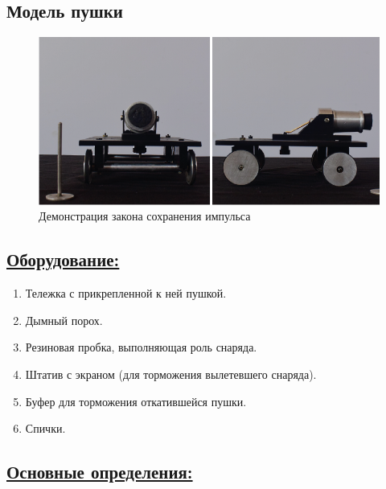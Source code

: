 \documentclass[14pt,a4paper,oneside]{extarticle}	%
\begin{document}

\begin{center}
	\subsection*{Модель пушки}
\end{center}

\begin{figure}[H] 
	\centering 	
	\includegraphics[width=1\linewidth]{cannon-1.png}
	\caption{Демонстрация  закона сохранения импульса}
	\label{cannon-1}
\end{figure}


\subsection*{\underline{Оборудование:}}

\begin{enumerate}
	\item Тележка с прикрепленной к ней пушкой.
	\item Дымный порох.
	\item Резиновая пробка, выполняющая роль снаряда.
	\item Штатив с экраном (для торможения вылетевшего снаряда).
	\item Буфер для торможения откатившейся пушки.
	\item Спички.
\end{enumerate}

\subsection*{\underline{Основные определения:}}
\end{document}
